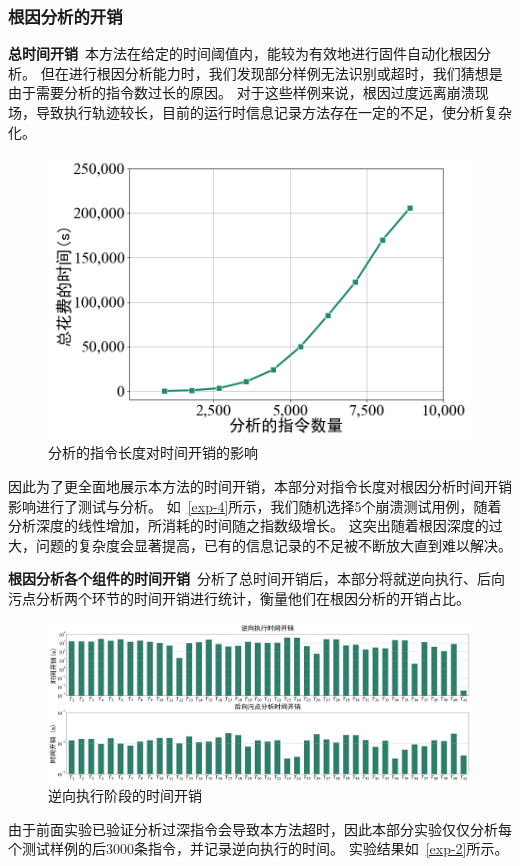 \subsubsection{根因分析的开销}
\textbf{总时间开销}\ 本方法在给定的时间阈值内，能较为有效地进行固件自动化根因分析。
但在进行根因分析能力时，我们发现部分样例无法识别或超时，我们猜想是由于需要分析的指令数过长的原因。
对于这些样例来说，根因过度远离崩溃现场，导致执行轨迹较长，目前的运行时信息记录方法存在一定的不足，使分析复杂化。
\begin{figure}[h]
    \centering
    \includegraphics[width=1.0\textwidth]{./figure/sns_4_exp_total_time.png}
    \caption{分析的指令长度对时间开销的影响}
    \label{exp-4}
\end{figure}

因此为了更全面地展示本方法的时间开销，本部分对指令长度对根因分析时间开销影响进行了测试与分析。
如~\autoref{exp-4}所示，我们随机选择5个崩溃测试用例，随着分析深度的线性增加，所消耗的时间随之指数级增长。
这突出随着根因深度的过大，问题的复杂度会显著提高，已有的信息记录的不足被不断放大直到难以解决。

\textbf{根因分析各个组件的时间开销}\ 分析了总时间开销后，本部分将就逆向执行、后向污点分析两个环节的时间开销进行统计，衡量他们在根因分析的开销占比。
\begin{figure}[h]
    \centering
    \includegraphics[width=1\textwidth]{./figure/sns_2_exp_resolve_time_backward_tainting_time.png}
    \caption{逆向执行阶段的时间开销}
    \label{exp-2}
\end{figure}
由于前面实验已验证分析过深指令会导致本方法超时，因此本部分实验仅仅分析每个测试样例的后3000条指令，并记录逆向执行的时间。
实验结果如~\autoref{exp-2}所示。


